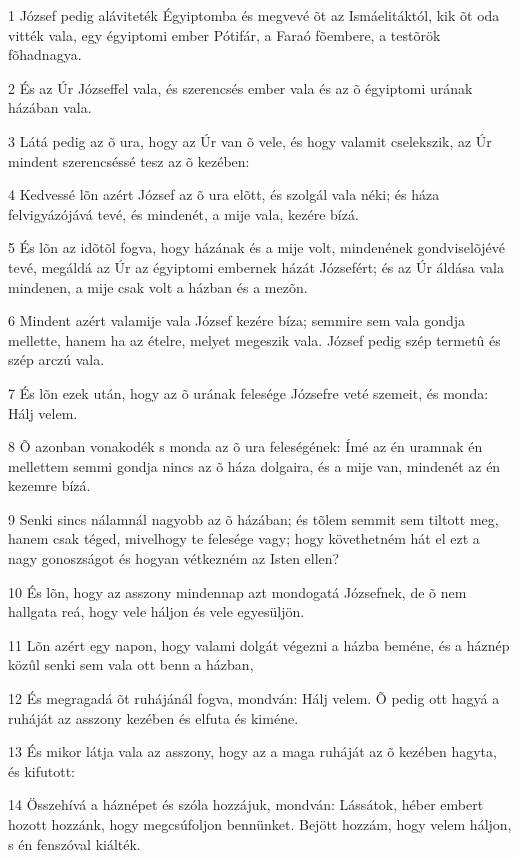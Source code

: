\par 1 József pedig aláviteték Égyiptomba és megvevé õt az Ismáelitáktól, kik õt oda vitték vala, egy égyiptomi ember Pótifár, a Faraó fõembere, a testõrök fõhadnagya.
\par 2 És az Úr Józseffel vala, és szerencsés ember vala és az õ égyiptomi urának házában vala.
\par 3 Látá pedig az õ ura, hogy az Úr van õ vele, és hogy valamit cselekszik, az Úr mindent szerencséssé tesz az õ kezében:
\par 4 Kedvessé lõn azért József az õ ura elõtt, és szolgál vala néki; és háza felvigyázójává tevé, és mindenét, a mije vala, kezére bízá.
\par 5 És lõn az idõtõl fogva, hogy házának és a mije volt, mindenének gondviselõjévé tevé, megáldá az Úr az égyiptomi embernek házát Józsefért; és az Úr áldása vala mindenen, a mije csak volt a házban és a mezõn.
\par 6 Mindent azért valamije vala József kezére bíza; semmire sem vala gondja mellette, hanem ha az ételre, melyet megeszik vala. József pedig szép termetû és szép arczú vala.
\par 7 És lõn ezek után, hogy az õ urának felesége Józsefre veté szemeit, és monda: Hálj velem.
\par 8 Õ azonban vonakodék s monda az õ ura feleségének: Ímé az én uramnak én mellettem semmi gondja nincs az õ háza dolgaira, és a mije van, mindenét az én kezemre bízá.
\par 9 Senki sincs nálamnál nagyobb az õ házában; és tõlem semmit sem tiltott meg, hanem csak téged, mivelhogy te felesége vagy; hogy követhetném hát el ezt a nagy gonoszságot és hogyan vétkezném az Isten ellen?
\par 10 És lõn, hogy az asszony mindennap azt mondogatá Józsefnek, de õ nem hallgata reá, hogy vele háljon és vele egyesüljön.
\par 11 Lõn azért egy napon, hogy valami dolgát végezni a házba beméne, és a háznép közûl senki sem vala ott benn a házban,
\par 12 És megragadá õt ruhájánál fogva, mondván: Hálj velem. Õ pedig ott hagyá a ruháját az asszony kezében és elfuta és kiméne.
\par 13 És mikor látja vala az asszony, hogy az a maga ruháját az õ kezében hagyta, és kifutott:
\par 14 Összehívá a háznépet és szóla hozzájuk, mondván: Lássátok, héber embert hozott hozzánk, hogy megcsúfoljon bennünket. Bejött hozzám, hogy velem háljon, s én fenszóval kiálték.
